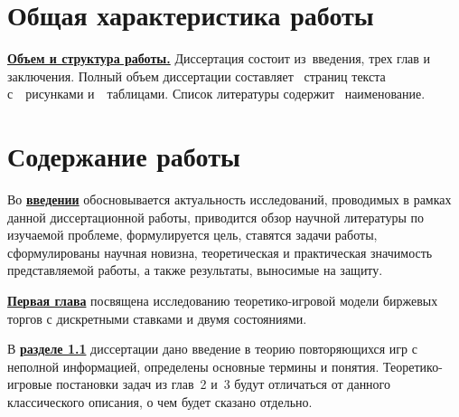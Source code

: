 
\section*{Общая характеристика работы}

\newcommand{\emphasis}[1]{\underline{\textbf{{#1}}}}
\newcommand{\actuality}{\emphasis{\actualityTXT}}
\newcommand{\progress}{\emphasis{\progressTXT}}
\newcommand{\aim}{\emphasis{\aimTXT}}
\newcommand{\tasks}{\emphasis{\tasksTXT}}
\newcommand{\researchsubject}{\emphasis{\researchsubjectTXT}}
\newcommand{\novelty}{\emphasis{\noveltyTXT}}
\newcommand{\influence}{\emphasis{\influenceTXT}}
\newcommand{\methods}{\emphasis{\methodsTXT}}
\newcommand{\defpositions}{\emphasis{\defpositionsTXT}}
\newcommand{\reliability}{\emphasis{\reliabilityTXT}}
\newcommand{\probation}{\emphasis{\probationTXT}}
\newcommand{\contribution}{\emphasis{\contributionTXT}}
\newcommand{\publications}{\emphasis{\publicationsTXT}}



\emphasis{Объем и структура работы.}
Диссертация состоит из~введения, трех глав и заключения.
Полный объем диссертации составляет ~страниц текста с~~рисунками и~~таблицами.
Список литературы содержит ~наименование.

\section*{Содержание работы}
Во \emphasis{введении} обосновывается актуальность исследований, проводимых в рамках данной диссертационной работы, приводится обзор научной литературы по изучаемой проблеме, формулируется цель, ставятся задачи работы, сформулированы научная новизна, теоретическая и практическая значимость представляемой работы, а также результаты, выносимые на защиту.

\emphasis{Первая глава} посвящена исследованию теоретико-игровой модели биржевых торгов с дискретными ставками и двумя состояниями.

В \emphasis{разделе 1.1} диссертации дано введение в теорию повторяющихся игр с неполной информацией, определены основные термины и понятия.
Теоретико-игровые постановки задач из глав~2 и~3 будут отличаться от данного классического описания, о чем будет сказано отдельно.

